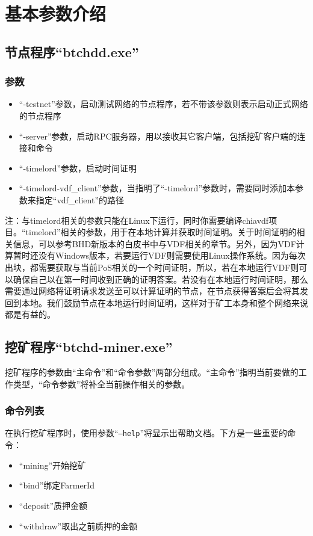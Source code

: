 \section{基本参数介绍}
\subsection{节点程序``btchdd.exe''}
\subsubsection{参数}
\begin{itemize}
    \item ``-testnet''参数，启动测试网络的节点程序，若不带该参数则表示启动正式网络的节点程序
    \item ``-server''参数，启动RPC服务器，用以接收其它客户端，包括挖矿客户端的连接和命令
    \item ``-timelord''参数，启动时间证明
    \item ``-timelord-vdf\_client''参数，当指明了``-timelord''参数时，需要同时添加本参数来指定``vdf\_client''的路径
\end{itemize}
\begin{flushleft}
    注：与timelord相关的参数只能在Linux下运行，同时你需要编译chiavdf项目。``timelord''相关的参数，用于在本地计算并获取时间证明。关于时间证明的相关信息，可以参考BHD新版本的白皮书中与VDF相关的章节。另外，因为VDF计算暂时还没有Windows版本，若要运行VDF则需要使用Linux操作系统。因为每次出块，都需要获取与当前PoS相关的一个时间证明，所以，若在本地运行VDF则可以确保自己以在第一时间收到正确的证明答案。若没有在本地运行时间证明，那么需要通过网络将证明请求发送至可以计算证明的节点，在节点获得答案后会将其发回到本地。我们鼓励节点在本地运行时间证明，这样对于矿工本身和整个网络来说都是有益的。
\end{flushleft}\subsection{挖矿程序``btchd-miner.exe''}
\begin{flushleft}
    挖矿程序的参数由``主命令''和``命令参数''两部分组成。``主命令''指明当前要做的工作类型，``命令参数''将补全当前操作相关的参数。
\end{flushleft}
\subsubsection{命令列表}
\begin{flushleft}
    在执行挖矿程序时，使用参数``\texttt{--help}''将显示出帮助文档。下方是一些重要的命令：
\end{flushleft}
\begin{itemize}
    \item ``mining''开始挖矿
    \item ``bind''绑定FarmerId
    \item ``deposit''质押金额
    \item ``withdraw''取出之前质押的金额
\end{itemize}
